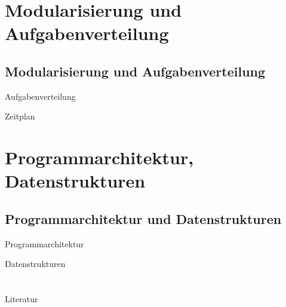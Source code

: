 \documentclass{beamer}
\begin{document}
\section{Modularisierung und Aufgabenverteilung}
\subsection[Modularisierung]{ Modularisierung und Aufgabenverteilung }

\begin{frame}{Aufgabenverteilung}
\end{frame}

\begin{frame}{Zeitplan}
\end{frame}


\section{Programmarchitektur, Datenstrukturen}
\subsection[Programmarchitektur]{ Programmarchitektur und Datenstrukturen }

\begin{frame}{Programmarchitektur}
\end{frame}

\begin{frame}{Datenstrukturen}
\end{frame}

\section{}
\subsection[]{}



\begin{frame}{Literatur}
\end{frame}
\end{document}
